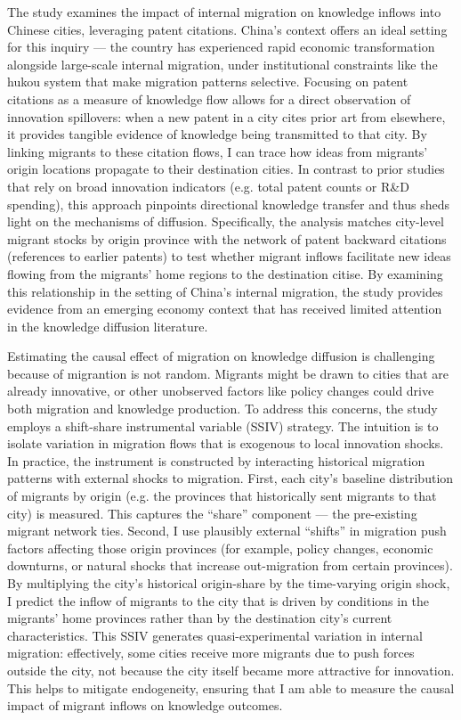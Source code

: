 \documentclass[12pt]{article}
\begin{document}
The study examines the impact of internal migration on knowledge inflows into Chinese cities, leveraging patent citations. China's context offers an ideal setting for this inquiry --- the country has experienced rapid economic transformation alongside large-scale internal migration, under institutional constraints like the hukou system that make migration patterns selective. Focusing on patent citations as a measure of knowledge flow allows for a direct observation of innovation spillovers: when a new patent in a city cites prior art from elsewhere, it provides tangible evidence of knowledge being transmitted to that city. By linking migrants to these citation flows, I can trace how ideas from migrants' origin locations propagate to their destination cities. In contrast to prior studies that rely on broad innovation indicators (e.g. total patent counts or R\&D spending), this approach pinpoints directional knowledge transfer and thus sheds light on the mechanisms of diffusion. Specifically, the analysis matches city-level migrant stocks by origin province with the network of patent backward citations (references to earlier patents) to test whether migrant inflows facilitate new ideas flowing from the migrants' home regions to the destination citise. By examining this relationship in the setting of China's internal migration, the study provides evidence from an emerging economy context that has received limited attention in the knowledge diffusion literature.

Estimating the causal effect of migration on knowledge diffusion is challenging because of migrantion is not random. Migrants might be drawn to cities that are already innovative, or other unobserved factors like policy changes could drive both migration and knowledge production. To address this concerns, the study employs a shift-share instrumental variable (SSIV) strategy. The intuition is to isolate variation in migration flows that is exogenous to local innovation shocks. In practice, the instrument is constructed by interacting historical migration patterns with external shocks to migration. First, each city's baseline distribution of migrants by origin (e.g. the provinces that historically sent migrants to that city) is measured. This captures the “share” component --- the pre-existing migrant network ties. Second, I use plausibly external “shifts” in migration push factors affecting those origin provinces (for example, policy changes, economic downturns, or natural shocks that increase out-migration from certain provinces). By multiplying the city's historical origin-share by the time-varying origin shock, I predict the inflow of migrants to the city that is driven by conditions in the migrants' home provinces rather than by the destination city's current characteristics. This SSIV generates quasi-experimental variation in internal migration: effectively, some cities receive more migrants due to push forces outside the city, not because the city itself became more attractive for innovation. This helps to mitigate endogeneity, ensuring that I am able to measure the causal impact of migrant inflows on knowledge outcomes. 
\end{document}
